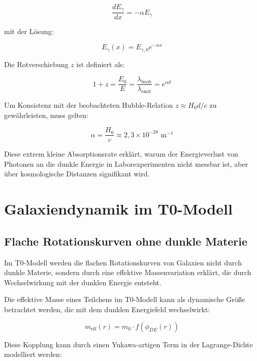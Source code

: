 \documentclass[a4paper,12pt]{article}
\theoremstyle{definition}
\theoremstyle{remark}
\begin{document}
	\begin{equation}
		\frac{dE_{\gamma}}{dx} = -\alpha E_{\gamma}
	\end{equation}
	
	mit der Lösung:
	
	\begin{equation}
		E_{\gamma}(x) = E_{\gamma,0} e^{-\alpha x}
	\end{equation}
	
	Die Rotverschiebung $z$ ist definiert als:
	
	\begin{equation}
		1 + z = \frac{E_0}{E} = \frac{\lambda_{\text{beob}}}{\lambda_{\text{emit}}} = e^{\alpha d}
	\end{equation}
	
	Um Konsistenz mit der beobachteten Hubble-Relation $z \approx H_0 d/c$ zu gewährleisten, muss gelten:
	
	\begin{equation}
		\alpha = \frac{H_0}{c} \approx 2{,}3 \times 10^{-28} \text{ m}^{-1}
	\end{equation}
	
	Diese extrem kleine Absorptionsrate erklärt, warum der Energieverlust von Photonen an die dunkle Energie in Laborexperimenten nicht messbar ist, aber über kosmologische Distanzen signifikant wird.
	
	\section{Galaxiendynamik im T0-Modell}
	
	\subsection{Flache Rotationskurven ohne dunkle Materie}
	
	Im T0-Modell werden die flachen Rotationskurven von Galaxien nicht durch dunkle Materie, sondern durch eine effektive Massenvariation erklärt, die durch Wechselwirkung mit der dunklen Energie entsteht. 
	
	Die effektive Masse eines Teilchens im T0-Modell kann als dynamische Größe betrachtet werden, die mit dem dunklen Energiefeld wechselwirkt:
	
	\begin{equation}
		m_{\text{eff}}(r) = m_0 \cdot f(\phi_{DE}(r))
	\end{equation}
	
	Diese Kopplung kann durch einen Yukawa-artigen Term in der Lagrange-Dichte modelliert werden:
	
\end{document}
